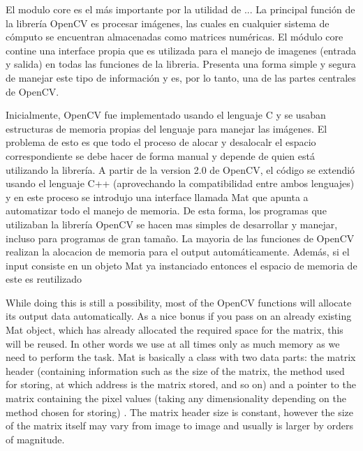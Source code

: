 \documentclass[a4paper,10pt]{report}
\begin{document}
El modulo core es el más importante por la utilidad de ...
La principal función de la librería OpenCV es procesar imágenes, las cuales en cualquier sistema de cómputo se encuentran almacenadas como matrices numéricas. 
El módulo core contine una interface propia que es utilizada para el manejo de imagenes (entrada y salida) en todas las funciones de la libreria. 
Presenta una forma simple y segura de manejar este tipo de información y es, por lo tanto, una de las partes centrales de OpenCV.

Inicialmente, OpenCV fue implementado usando el lenguaje C y se usaban estructuras de memoria propias del lenguaje para manejar las imágenes. 
El problema de esto es que todo el proceso de alocar y desalocalr el espacio correspondiente se debe hacer de forma manual y depende de quien está utilizando la librería. 
A partir de la version 2.0 de OpenCV, el código se extendió usando el lenguaje C++ (aprovechando la compatibilidad entre ambos lenguajes) y en este proceso se introdujo una interface llamada Mat que apunta a automatizar todo el manejo de memoria. 
De esta forma, los programas que utilizaban la librería OpenCV se hacen mas simples de desarrollar y manejar, incluso para programas de gran tamaño.
La mayoria de las funciones de OpenCV realizan la alocacion de memoria para el output automáticamente. Además, si el input consiste en un objeto Mat ya instanciado entonces el espacio de memoria de este es reutilizado

 While doing this is still a possibility, most of the OpenCV functions will allocate its output data automatically. As a nice bonus if you pass on an already existing Mat object, which has already allocated the required space for the matrix, this will be reused. In other words we use at all times only as much memory as we need to perform the task.
Mat is basically a class with two data parts: the matrix header (containing information such as the size of the matrix, the method used for storing, at which address is the matrix stored, and so on) and a pointer to the matrix containing the pixel values (taking any dimensionality depending on the method chosen for storing) . The matrix header size is constant, however the size of the matrix itself may vary from image to image and usually is larger by orders of magnitude.







\end{document}
